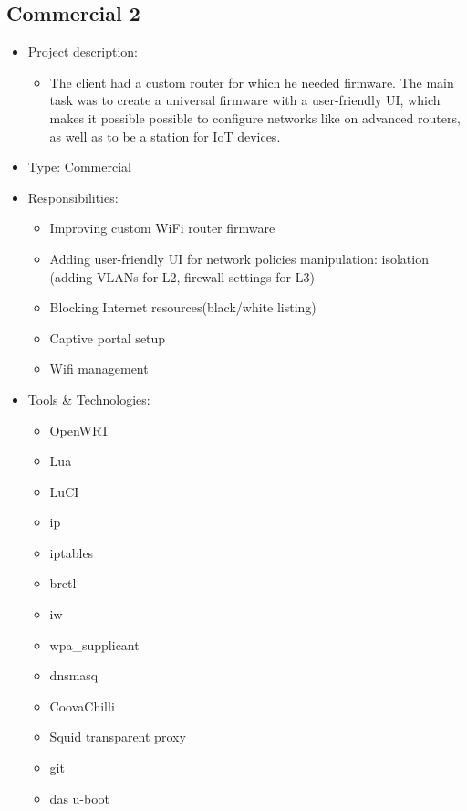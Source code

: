 \subsection{Commercial 2}
\begin{itemize}
    \item Project description:
    \begin{itemize}
        \item The client had a custom router for which he needed firmware. The main task
              was to create a universal firmware with a user-friendly UI, which makes it
              possible possible to configure networks like on advanced routers, as well as to be a
              station for IoT devices.
    \end{itemize}
    \item Type: Commercial
    \item Responsibilities:
    \begin{itemize}
        \item Improving custom WiFi router firmware
        \item Adding user-friendly UI for network policies manipulation:
              isolation (adding VLANs for L2, firewall settings for L3)
        \item Blocking Internet resources(black/white listing)
        \item Captive portal setup
        \item Wifi management
    \end{itemize}
    \item Tools \& Technologies:
    \begin{itemize}
        \item OpenWRT
        \item Lua
        \item LuCI
        \item ip
        \item iptables
        \item brctl
        \item iw
        \item wpa\_supplicant
        \item dnsmasq
        \item CoovaChilli
        \item Squid transparent proxy
        \item git
        \item das u-boot
    \end{itemize}
\end{itemize}

